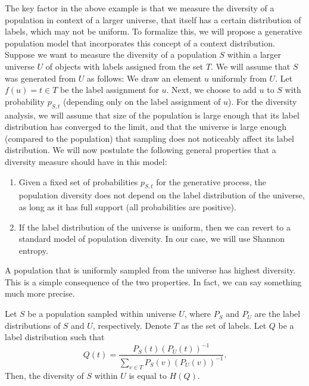 \documentclass{article} %
\begin{document}
The key factor in the above example is that we measure the diversity
of a population in context of a larger universe, that itself has a
certain distribution of labels, which may not be uniform.
To formalize this, we will propose
a generative population model that incorporates this concept of
a context distribution. Suppose we want to measure the diversity
of a population $S$ within a larger universe $U$ of objects with
labels assigned from the set $T$. We will assume that $S$ was
generated from 
$U$ as follows: We draw an element $u$ uniformly from $U$. Let
$f(u)=t\in T$ be the label assignment for $u$. Next, we choose to add
$u$ to $S$ with probability $p_{S,t}$ (depending only on the label
assignment of $u$). For the diversity analysis, we will assume that
size of the population is large enough that its label
distribution has converged to the limit, and that the universe is
large enough (compared to the population) that sampling does not
noticeably affect its label distribution. We will now postulate
the following general properties that a diversity measure
should have in this model:
\begin{enumerate}
\item Given a fixed set of probabilities $p_{S,t}$ for the generative
  process, the population diversity does not depend on the label
  distribution of the universe, as long as it has full support (all
  probabilities are positive).
\item If the label distribution of the universe is uniform, then we can
  revert to a standard model of population diversity. In our case, we
  will use Shannon entropy.
\end{enumerate}

\ber
A population that is uniformly sampled from the universe has
  highest diversity. 
\eer
This is a simple consequence of the two properties. In fact, we can
say something much more precise.

\bep\label{population-model}
Let $S$ be a population sampled within universe $U$, where $P_S$ and
$P_U$ are the label distributions of $S$ and $U$,
respectively. Denote $T$ as the set of labels. Let $Q$ be a label
distribution such that
\[Q(t)=\frac{P_S(t)(P_U(t))^{-1}}{\sum_{v\in T} P_S(v)(P_U(v))^{-1}}.\]
Then, the diversity of $S$ within $U$ is equal to $H(Q)$.
\eep
\end{document}
